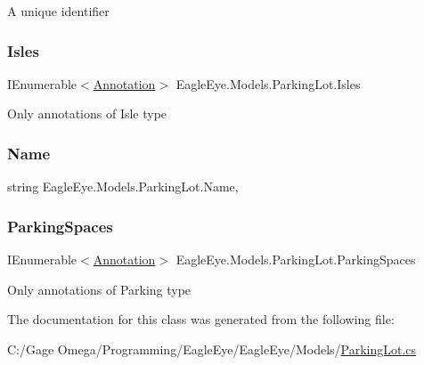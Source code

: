 A unique identifier 

\mbox{\label{class_eagle_eye_1_1_models_1_1_parking_lot_ac1070fa7799989793d2b8cf0c54318b3}} 
\subsubsection{\texorpdfstring{Isles}{Isles}}
{\footnotesize\ttfamily I\+Enumerable$<$\mbox{\hyperlink{class_eagle_eye_1_1_models_1_1_annotation}{Annotation}}$>$ Eagle\+Eye.\+Models.\+Parking\+Lot.\+Isles\hspace{0.3cm}{\ttfamily [get]}}



Only annotations of Isle type 

\mbox{\label{class_eagle_eye_1_1_models_1_1_parking_lot_ac2860bd9c6046f6f6b9b10461c0b4619}} 
\subsubsection{\texorpdfstring{Name}{Name}}
{\footnotesize\ttfamily string Eagle\+Eye.\+Models.\+Parking\+Lot.\+Name\hspace{0.3cm}{\ttfamily [get]}, {\ttfamily [set]}}





\mbox{\label{class_eagle_eye_1_1_models_1_1_parking_lot_af3127595a546a4f0b4c4dcda6e72fc3f}} 
\subsubsection{\texorpdfstring{ParkingSpaces}{ParkingSpaces}}
{\footnotesize\ttfamily I\+Enumerable$<$\mbox{\hyperlink{class_eagle_eye_1_1_models_1_1_annotation}{Annotation}}$>$ Eagle\+Eye.\+Models.\+Parking\+Lot.\+Parking\+Spaces\hspace{0.3cm}{\ttfamily [get]}}



Only annotations of Parking type 



The documentation for this class was generated from the following file\+:\begin{DoxyCompactItemize}
\item 
C\+:/\+Gage Omega/\+Programming/\+Eagle\+Eye/\+Eagle\+Eye/\+Models/\mbox{\hyperlink{_models_2_parking_lot_8cs}{Parking\+Lot.\+cs}}\end{DoxyCompactItemize}
